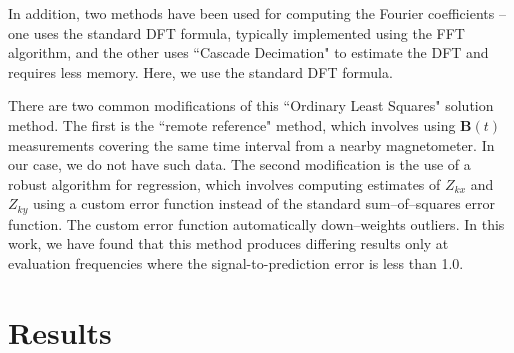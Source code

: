 \documentclass[draft,linenumbers]{agujournal2018}
\begin{document}
In addition, two methods have been used for computing the Fourier coefficients -- one uses the standard DFT formula, typically implemented using the FFT algorithm, and the other uses ``Cascade Decimation" \citep{Wight1980} to estimate the DFT and requires less memory. Here, we use the standard DFT formula.

There are two common modifications of this ``Ordinary Least Squares" solution method. The first is the ``remote reference"  method, which involves using $\mathbf{B}(t)$ measurements covering the same time interval from a nearby magnetometer. In our case, we do not have such data. The second modification is the use of a robust algorithm for regression, which involves computing estimates of $Z_{kx}$ and $Z_{ky}$ using a custom error function instead of the standard sum--of--squares error function. The custom error function automatically down--weights outliers. In this work, we have found that this method produces differing results only at evaluation frequencies where the signal-to-prediction error is less than 1.0.

\section{Results}
\label{section:Results}
\end{document}

